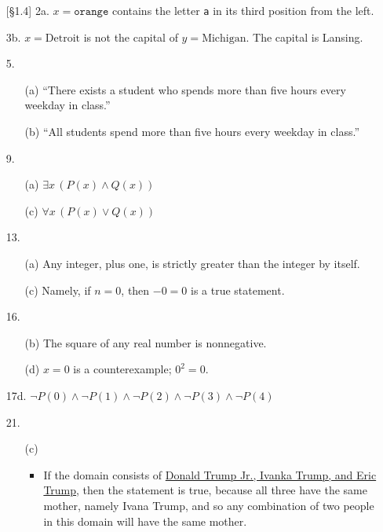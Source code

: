 \documentclass{article}
\begin{document}
\begin{enumerate}
    \item[{[\S 1.4]} 2a.]  $x = \texttt{orange}$ contains the letter \texttt{a} in its third position from the left.
    \item[3b.]  $x = \textrm{Detroit}$ is not the capital of $y = \textrm{Michigan}$. The capital is Lansing.
    \item[5.]
        \begin{itemize}
            \item[(a)] ``There exists a student who spends more than five hours every weekday in class.''
            \item[(b)] ``All students spend more than five hours every weekday in class.''
        \end{itemize}
    \item[9.]
        \begin{itemize}
            \item[(a)] $\exists x \, \left( P(x) \land Q(x) \right)$
            \item[(c)] $\forall x \, \left( P(x) \lor Q(x) \right)$
        \end{itemize}
    \item[13.]
        \begin{itemize}
            \item[(a)]  Any integer, plus one, is strictly greater than the integer by itself.
            \item[(c)]  Namely, if $n = 0$, then $-0 = 0$ is a true statement.
        \end{itemize}
    \item[16.]
        \begin{itemize}
            \item[(b)]  The square of any real number is nonnegative.
            \item[(d)]  $x = 0$ is a counterexample; $0^2 = 0$.
        \end{itemize}
    \item[17d.] $\neg P(0) \land \neg P(1) \land \neg P(2) \land \neg P(3) \land \neg P(4)$
    \item[21.]
        \begin{itemize}
            \item[(c)]
                \begin{itemize}
                    \item If the domain consists of \underline{Donald Trump Jr., Ivanka Trump, and Eric Trump}, then the statement is true, because all three have the same mother, namely Ivana Trump, and so any combination of two people in this domain will have the same mother.

\end{itemize}
\end{itemize}
\end{enumerate}
\end{document}
